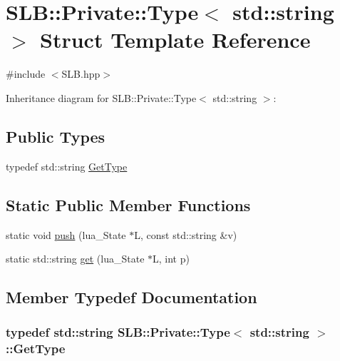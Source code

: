 \hypertarget{structSLB_1_1Private_1_1Type_3_01std_1_1string_01_4}{}\section{S\+LB\+:\+:Private\+:\+:Type$<$ std\+:\+:string $>$ Struct Template Reference}
\label{structSLB_1_1Private_1_1Type_3_01std_1_1string_01_4}


{\ttfamily \#include $<$S\+L\+B.\+hpp$>$}



Inheritance diagram for S\+LB\+:\+:Private\+:\+:Type$<$ std\+:\+:string $>$\+:
\subsection*{Public Types}
\begin{DoxyCompactItemize}
\item 
typedef std\+::string \hyperlink{structSLB_1_1Private_1_1Type_3_01std_1_1string_01_4_a5db09c8403c5cc100fd7b0b86c8334c4}{Get\+Type}
\end{DoxyCompactItemize}
\subsection*{Static Public Member Functions}
\begin{DoxyCompactItemize}
\item 
static void \hyperlink{structSLB_1_1Private_1_1Type_3_01std_1_1string_01_4_a1f2d0e9e64c9a1064a0227f92ab7e241}{push} (lua\+\_\+\+State $\ast$L, const std\+::string \&v)
\item 
static std\+::string \hyperlink{structSLB_1_1Private_1_1Type_3_01std_1_1string_01_4_ad0e2a00c9b427053cc48a443581eec2b}{get} (lua\+\_\+\+State $\ast$L, int p)
\end{DoxyCompactItemize}


\subsection{Member Typedef Documentation}
\subsubsection[{\texorpdfstring{Get\+Type}{GetType}}]{\setlength{\rightskip}{0pt plus 5cm}typedef std\+::string {\bf S\+L\+B\+::\+Private\+::\+Type}$<$ std\+::string $>$\+::{\bf Get\+Type}}\hypertarget{structSLB_1_1Private_1_1Type_3_01std_1_1string_01_4_a5db09c8403c5cc100fd7b0b86c8334c4}{}\label{structSLB_1_1Private_1_1Type_3_01std_1_1string_01_4_a5db09c8403c5cc100fd7b0b86c8334c4}


